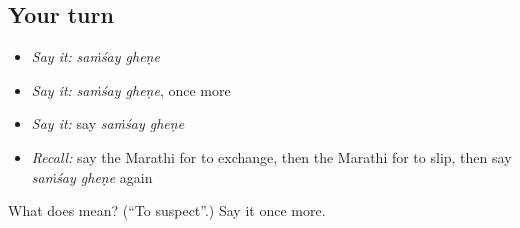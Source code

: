 \subsection*{Your turn}
\begin{itemize}
\raggedright
  \item \emph{Say it:} \emph{saṁśay gheṇe}
  \item \emph{Say it:} \emph{saṁśay gheṇe}, once more
  \item \emph{Say it:} say \emph{saṁśay gheṇe}
  \item \emph{Recall:} say the Marathi for to exchange, then the Marathi for to slip, then say \emph{saṁśay gheṇe} again
\end{itemize}

\begin{tcolorbox}[breakable,colback=teal!4,colframe=teal!35!black,title={Before you move on}]
What does   mean? (\textquotedblleft{}To suspect\textquotedblright{}.) Say it once more.
\end{tcolorbox}
